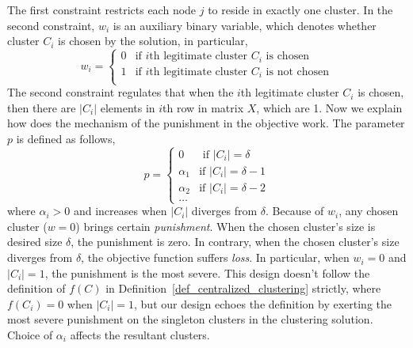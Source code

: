 \documentclass[10pt,journal,compsoc]{IEEEtran}
\theoremstyle{mytheoremstyle}
\theoremstyle{mytheoremstyle}
\theoremstyle{mytheoremstyle}
\begin{document}
The first constraint restricts each node $j$ to reside in exactly one cluster.
In the second constraint, $w_i$ is an auxiliary binary variable, which denotes whether cluster $C_i$ is chosen by the solution, in particular, 
$$
w_i = \left\{ \begin{array}{rl}
0 &\mbox{if $i$th legitimate cluster $C_i$ is chosen} \\
1 &\mbox{if $i$th legitimate cluster $C_i$ is not chosen} \\
\end{array} \right.
$$
The second constraint regulates that when the $i$th legitimate cluster $C_i$ is chosen, then  there are $|C_i|$ elements in $i$th row in matrix $X$, which are 1.
%
Now we explain how does the mechanism of the punishment in the objective work. 
The parameter $p$ is defined as follows,
$$
p = \left\{ \begin{array}{rl}
0 &\mbox{ if $|C_i|=\delta$} \\
\alpha_1 &\mbox{if $|C_i|=\delta-1$} \\
\alpha_2 &\mbox{if $|C_i|=\delta-2$} \\
\dots
\end{array} \right.
$$
where $\alpha_i>0$ and increases when $|C_i|$ diverges from $\delta$.
Because of $w_i$, any chosen cluster ($w=0$) brings certain \textit{punishment}.
When the chosen cluster's size is desired size $\delta$, the punishment is zero.
In contrary, when the chosen cluster's size diverges from $\delta$, the objective function suffers \textit{loss}.
In particular, when $w_i=0$ and $|C_i|=1$, the punishment is the most severe.
This design doesn't follow the definition of $f(C)$ in Definition~\ref{def_centralized_clustering} strictly, where $f(C_i)=0$ when $|C_i|=1$, but our design echoes the definition by exerting the most severe punishment on the singleton clusters in the clustering solution.
Choice of $\alpha_i$ affects the resultant clusters.




\end{document}
